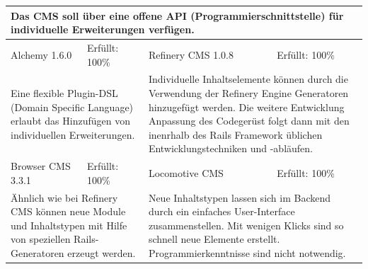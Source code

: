 \newline
\newline
\newline
\begin{tabular}[!ht]{|l|l|l|l|}
\hline
\multicolumn{4}{|p{15cm}|}{\textbf{Das CMS soll über eine offene API (Programmierschnittstelle) für individuelle Erweiterungen verfügen.}} \\
\hline
  Alchemy 1.6.0 & \cellcolor{green}Erfüllt: 100\% & Refinery CMS 1.0.8 & \cellcolor{green}Erfüllt: 100\% \\
  \hline
  \multicolumn{2}{|p{7.5cm}|}{Eine flexible Plugin-DSL (Domain Specific Language) erlaubt das Hinzufügen von individuellen Erweiterungen.}
   & \multicolumn{2}{p{7.5cm}|}{Individuelle Inhaltselemente können durch die Verwendung der Refinery Engine Generatoren hinzugefügt werden. Die weitere Entwicklung Anpassung des Codegerüst folgt dann mit den inenrhalb des Rails Framework üblichen Entwicklungstechniken und -abläufen.} \\
  \hline
  Browser CMS 3.3.1 & \cellcolor{green}Erfüllt: 100\% & Locomotive CMS & \cellcolor{green}Erfüllt: 100\% \\
  \hline
  \multicolumn{2}{|p{7.5cm}|}{Ähnlich wie bei Refinery CMS können neue Module und Inhaltstypen mit Hilfe von speziellen Rails-Generatoren erzeugt werden.} & \multicolumn{2}{p{7.5cm}|}{Neue Inhaltstypen lassen sich im Backend durch ein einfaches User-Interface zusammenstellen.  Mit wenigen Klicks sind so schnell neue Elemente erstellt. Programmierkenntnisse sind nicht notwendig.} \\
\hline
\end{tabular}
\newline
\newline
\newline
